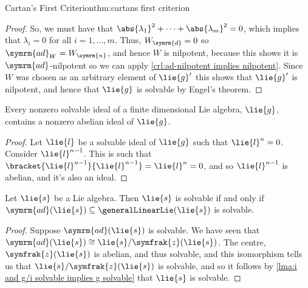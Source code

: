 \documentclass[fleqn]{NotesClass}
\newcommand{\isomorphic}{\cong}
\newcommand{\ad}{\symrm{ad}}
\newcommand{\centre}{\symfrak{z}}
\begin{document}
\begin{thm}{Cartan's First Criterion}{thm:cartans first criterion}
\begin{proof}
            So, we must have that \(\abs{\lambda_1}^2 + \dotsb + \abs{\lambda_m}^2 = 0\), which implies that \(\lambda_i = 0\) for all \(i = 1, \dotsc, m\).
            Thus, \(W_{\symrm{d}} = 0\) so \(\ad_W = W_{\symrm{n}}\), and hence \(W\) is nilpotent, because this shows it is \(\ad\)-nilpotent so we can apply \cref{crl:ad-nilpotent implies nilpotent}.
            Since \(W\) was chosen as an arbitrary element of \(\lie{g}'\) this shows that \(\lie{g}'\) is nilpotent, and hence that \(\lie{g}\) is solvable by Engel's theorem.
        \end{proof}
    \end{thm}
    
    \begin{lma}{}{}
        Every nonzero solvable ideal of a finite dimensional Lie algebra, \(\lie{g}\), contains a nonzero abelian ideal of \(\lie{g}\).
        \begin{proof}
            Let \(\lie{l}\) be a solvable ideal of \(\lie{g}\) such that \(\lie{l}^n = 0\).
            Consider \(\lie{l}^{n-1}\).
            This is such that \(\bracket{\lie{l}^{n-1}}{\lie{l}^{n-1}} = \lie{l}^n = 0\), and so \(\lie{l}^{n-1}\) is abelian, and it's also an ideal.
        \end{proof}
    \end{lma}
    
    \begin{lma}{}{}
        Let \(\lie{s}\) be a Lie algebra.
        Then \(\lie{s}\) is solvable if and only if \(\ad(\lie{s}) \subseteq \generalLinearLie(\lie{s})\) is solvable.
        \begin{proof}
            Suppose \(\ad(\lie{s})\) is solvable.
            We have seen that \(\ad(\lie{s}) \isomorphic \lie{s}/\centre(\lie{s})\).
            The centre, \(\centre(\lie{s})\) is abelian, and thus solvable, and this isomorphism tells us that \(\lie{s}/\centre(\lie{s})\) is solvable, and so it follows by \cref{lma:i and g/i solvable implies g solvable} that \(\lie{s}\) is solvable.
        \end{proof}
    \end{lma}
    
\end{document}
